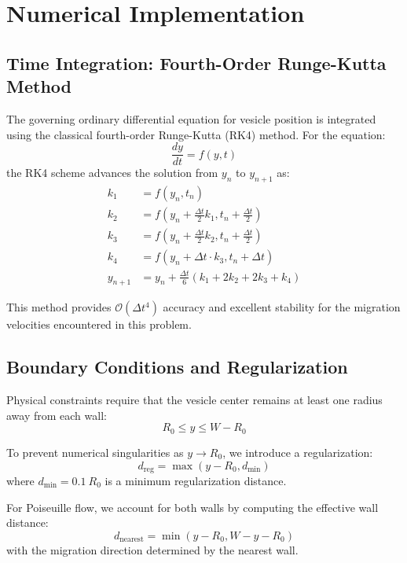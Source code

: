 \documentclass{article}
\begin{document}
\section{Numerical Implementation}

\subsection{Time Integration: Fourth-Order Runge-Kutta Method}

The governing ordinary differential equation for vesicle position is integrated using the classical fourth-order Runge-Kutta (RK4) method. For the equation:
\begin{equation}
    \frac{dy}{dt} = f(y, t)
\end{equation}
the RK4 scheme advances the solution from $y_n$ to $y_{n+1}$ as:
\begin{align}
    k_1 &= f(y_n, t_n) \\
    k_2 &= f\left(y_n + \frac{\Delta t}{2} k_1, t_n + \frac{\Delta t}{2}\right) \\
    k_3 &= f\left(y_n + \frac{\Delta t}{2} k_2, t_n + \frac{\Delta t}{2}\right) \\
    k_4 &= f\left(y_n + \Delta t \cdot k_3, t_n + \Delta t\right) \\
    y_{n+1} &= y_n + \frac{\Delta t}{6}\left(k_1 + 2k_2 + 2k_3 + k_4\right)
    \label{eq:rk4}
\end{align}

This method provides $\mathcal{O}(\Delta t^4)$ accuracy and excellent stability for the migration velocities encountered in this problem.

\subsection{Boundary Conditions and Regularization}

Physical constraints require that the vesicle center remains at least one radius away from each wall:
\begin{equation}
    R_0 \leq y \leq W - R_0
\end{equation}

To prevent numerical singularities as $y \to R_0$, we introduce a regularization:
\begin{equation}
    d_{\text{reg}} = \max(y - R_0, d_{\min})
\end{equation}
where $d_{\min} = 0.1 \ R_0$ is a minimum regularization distance.

For Poiseuille flow, we account for both walls by computing the effective wall distance:
\begin{equation}
    d_{\text{nearest}} = \min(y - R_0, W - y - R_0)
\end{equation}
with the migration direction determined by the nearest wall.
\end{document}
